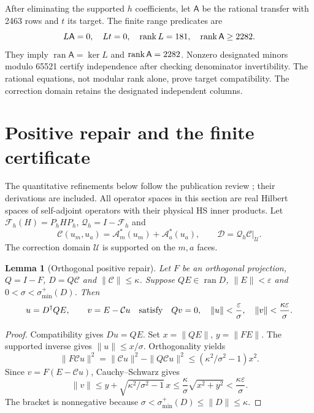 \documentclass[11pt,a4paper]{article}
\newtheorem{lemma}[theorem]{Lemma}
\theoremstyle{definition}\newtheorem{definition}[theorem]{Definition}
\theoremstyle{remark}\newtheorem{remark}[theorem]{Remark}
\DeclareMathOperator{\ran}{ran}\DeclareMathOperator{\vecop}{vec}
\numberwithin{equation}{section}
\begin{document}
After eliminating the supported $h$ coefficients, let
$\mathsf A$ be the rational transfer with 2463 rows and $t$ its target.
The finite range predicates are
\begin{equation}
L\mathsf A=0,\quad Lt=0,\quad \operatorname{rank} L=181,\quad
\operatorname{rank}\mathsf A\ge2282.
\label{eq:rangepredicates}
\end{equation}
They imply $\ran\mathsf A=\ker L$ and $\operatorname{rank}\mathsf A=2282$.
Nonzero designated minors modulo 65521 certify independence after
checking denominator invertibility. The rational equations, not
modular rank alone, prove target compatibility.
The correction domain retains the designated independent columns.

\section{Positive repair and the finite certificate}\label{sec:repair}
The quantitative refinements below follow the publication review
\cite{review}; their derivations are included. All operator spaces in this
section are real Hilbert spaces of
self-adjoint operators with their physical HS inner products.
Let $\mathcal F_h(H)=P_hHP_h$, $\mathcal Q_h=I-\mathcal F_h$ and
\[
\mathcal C(u_m,u_a)=\mathcal A_m^*(u_m)+\mathcal A_a^*(u_a),\qquad
\mathcal D=\mathcal Q_h\mathcal C|_{\mathcal U}.
\]
The correction domain $\mathcal U$ is supported on the $m,a$ faces.

\begin{lemma}[Orthogonal positive repair]\label{lem:repair}
Let $F$ be an orthogonal projection, $Q=I-F$, $D=Q\mathcal C$
and $\|\mathcal C\|\le\kappa$. Suppose
$QE\in\ran D$, $\|E\|<\varepsilon$ and
$0<\sigma<\sigma_{\min}^+(D)$.
Then
\begin{equation}
u=D^\dagger QE,\qquad v=E-\mathcal Cu
\quad\hbox{satisfy}\quad
Qv=0,\quad
\|u\|<\frac{\varepsilon}{\sigma},\quad
\|v\|<\frac{\kappa\varepsilon}{\sigma}.
\label{eq:repairbounds}
\end{equation}
\end{lemma}
\begin{proof}
Compatibility gives $Du=QE$. Set $x=\|QE\|$, $y=\|FE\|$.
The supported inverse gives $\|u\|\le x/\sigma$. Orthogonality yields
\[
\|F\mathcal Cu\|^2
=\|\mathcal Cu\|^2-\|Q\mathcal Cu\|^2
\le(\kappa^2/\sigma^2-1)x^2.
\]
Since $v=F(E-\mathcal Cu)$, Cauchy--Schwarz gives
\[
\|v\|\le y+\sqrt{\kappa^2/\sigma^2-1}\,x
\le\frac{\kappa}{\sigma}\sqrt{x^2+y^2}
<\frac{\kappa\varepsilon}{\sigma}.
\]
The bracket is nonnegative because
$\sigma<\sigma_{\min}^+(D)\le\|D\|\le\kappa$.
\end{proof}
\end{document}
